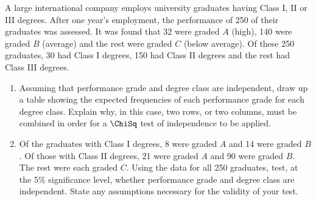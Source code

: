 \begin{problem}
    A large international company employs university graduates having Class I, II or III degrees. After one year's employment, the performance of 250 of their graduates was assessed. It was found that 32 were graded $A$ (high), 140 were graded $B$ (average) and the rest were graded $C$ (below average). Of these 250 graduates, 30 had Class I degrees, 150 had Class II degrees and the rest had Class III degrees.

    \begin{enumerate}
        \item Assuming that performance grade and degree class are independent, draw up a table showing the expected frequencies of each performance grade for each degree class. Explain why, in this case, two rows, or two columns, must be combined in order for a $\ChiSq$ test of independence to be applied.
        \item Of the graduates with Class I degrees, 8 were graded $A$ and 14 were graded $B$. Of those with Class II degrees, 21 were graded $A$ and 90 were graded $B$. The rest were each graded $C$. Using the data for all 250 graduates, test, at the 5\% significance level, whether performance grade and degree class are independent. State any assumptions necessary for the validity of your test.
    \end{enumerate}
\end{problem}
